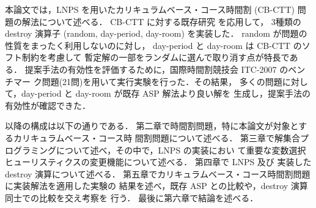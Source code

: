 本論文では，LNPS を用いたカリキュラムベース・コース時間割 (CB-CTT)
問題の解法について述べる．
CB-CTT に対する既存研究
\cite{%
 kiefer16:patat}
 を応用して，
3種類の destroy 演算子 (random, day-period, day-room) を実装した．
random が問題の性質をまったく利用しないのに対し，
day-period と day-room は CB-CTT のソフト制約を考慮して
暫定解の一部をランダムに選んで取り消す点が特長である．
%
提案手法の有効性を評価するために，国際時間割競技会 ITC-2007 のベンチマー
ク問題(21問)を用いて実行実験を行った．その結果，
多くの問題に対して，day-period と day-room が既存 ASP 解法より良い解を
生成し，提案手法の有効性が確認できた．

以降の構成は以下の通りである．
第二章で時間割問題，特に本論文が対象とするカリキュラムベース・コース時
間割問題について述べる．
第三章で解集合プログラミングについて述べ，その中で，LNPS の実装におい
て重要な変数選択ヒューリスティクスの変更機能について述べる．
第四章で LNPS 及び 実装した destroy 演算について述べる．
第五章でカリキュラムベース・コース時間割問題に実装解法を適用した実験の
結果を述べ，既存 ASP との比較や，destroy 演算同士での比較を交え考察を
行う．
最後に第六章で結論を述べる．



